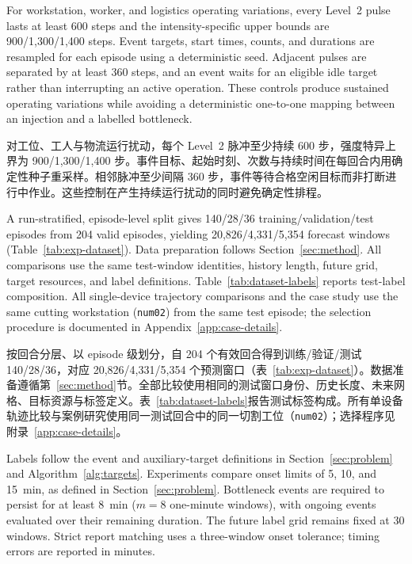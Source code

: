 \documentclass[a4paper,fleqn]{cas-dc}
\newcommand{\zhpara}[1]{%
  \par\begingroup\small\color{black!72}\noindent #1\par\endgroup}
\begin{document}
For workstation, worker, and logistics operating variations, every Level~2 pulse lasts at least 600 steps and the intensity-specific upper bounds are 900/1,300/1,400 steps. Event targets, start times, counts, and durations are resampled for each episode using a deterministic seed. Adjacent pulses are separated by at least 360 steps, and an event waits for an eligible idle target rather than interrupting an active operation. These controls produce sustained operating variations while avoiding a deterministic one-to-one mapping between an injection and a labelled bottleneck.

\zhpara{对工位、工人与物流运行扰动，每个 Level~2 脉冲至少持续 600 步，强度特异上界为 900/1{,}300/1{,}400 步。事件目标、起始时刻、次数与持续时间在每回合内用确定性种子重采样。相邻脉冲至少间隔 360 步，事件等待合格空闲目标而非打断进行中作业。这些控制在产生持续运行扰动的同时避免确定性排程。}




A run-stratified, episode-level split gives 140/28/36 training/validation/test episodes from 204 valid episodes, yielding 20,826/4,331/5,354 forecast windows (Table~\ref{tab:exp-dataset}). Data preparation follows Section~\ref{sec:method}. All comparisons use the same test-window identities, history length, future grid, target resources, and label definitions. Table~\ref{tab:dataset-labels} reports test-label composition. All single-device trajectory comparisons and the case study use the same cutting workstation (\texttt{num02}) from the same test episode; the selection procedure is documented in Appendix~\ref{app:case-details}.

\zhpara{按回合分层、以 episode 级划分，自 204 个有效回合得到训练/验证/测试 140/28/36，对应 20{,}826/4{,}331/5{,}354 个预测窗口（表~\ref{tab:exp-dataset}）。数据准备遵循第~\ref{sec:method}节。全部比较使用相同的测试窗口身份、历史长度、未来网格、目标资源与标签定义。表~\ref{tab:dataset-labels}报告测试标签构成。所有单设备轨迹比较与案例研究使用同一测试回合中的同一切割工位（\texttt{num02}）；选择程序见附录~\ref{app:case-details}。}




Labels follow the event and auxiliary-target definitions in Section~\ref{sec:problem} and Algorithm~\ref{alg:targets}. Experiments compare onset limits of 5, 10, and 15~min, as defined in Section~\ref{sec:problem}. Bottleneck events are required to persist for at least 8~min ($m=8$ one-minute windows), with ongoing events evaluated over their remaining duration. The future label grid remains fixed at 30 windows. Strict report matching uses a three-window onset tolerance; timing errors are reported in minutes.
\end{document}
